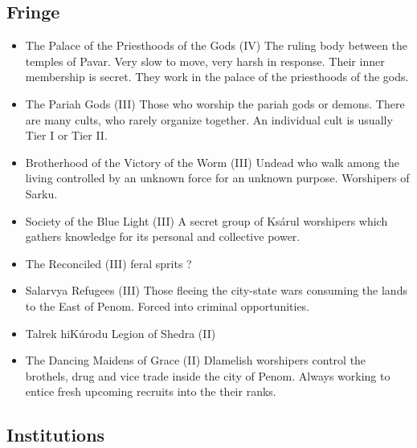 \subsection{Fringe}

\begin{itemize}
\item The Palace of the Priesthoods of the Gods (IV) The ruling body between the temples of Pavar. Very slow to move, very harsh in response. Their inner membership is secret. They work in the palace of the priesthoods of the gods.
\item The Pariah Gods (III) Those who worship the pariah gods or demons. There are many cults, who rarely organize together. An individual cult is usually Tier I or Tier II.
\item Brotherhood of the Victory of the Worm (III) Undead who walk among the living controlled by an unknown force for an unknown purpose. Worshipers of Sarku.
\item Society of the Blue Light (III) A secret group of Ksárul worshipers which gathers knowledge for its personal and collective power.

\item The Reconciled (III) feral sprits ?
\item Salarvya Refugees (III) Those fleeing the city-state wars consuming the lands to the East of Penom. Forced into criminal opportunities.
\item Talrek hiKúrodu Legion of Shedra (II)
\item The Dancing Maidens of Grace (II) Dlamelish worshipers control the brothels, drug and vice trade inside the city of Penom. Always working to entice fresh upcoming recruits into the their ranks.
\end{itemize}

\subsection{Institutions}

